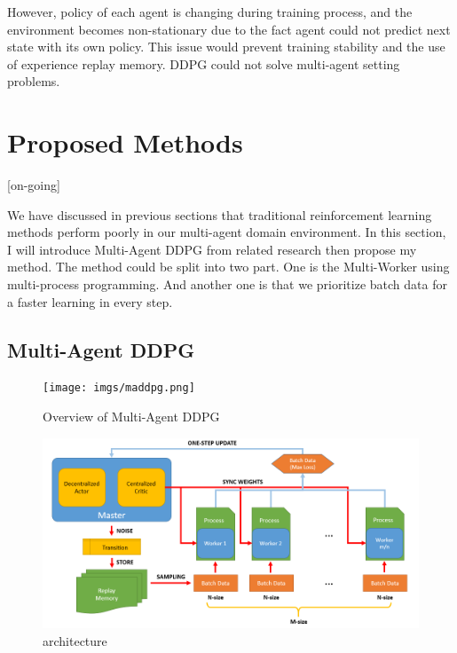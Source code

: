 \documentclass[11pt,twocolumn]{jarticle} %
\begin{document}
However, policy of each agent is changing during training process, and the environment becomes non-stationary due to the fact agent could not predict next state with its own policy. This issue would prevent training stability and the use of experience replay memory. DDPG could not solve multi-agent setting problems. \par

\section{Proposed Methods}[on-going]

We have discussed in previous sections that traditional reinforcement learning methods perform poorly in our multi-agent domain environment. In this section, I will introduce Multi-Agent DDPG from related research then propose my method. The method could be split into two part. One is the Multi-Worker using multi-process programming. And another one is that we prioritize batch data for a faster learning in every step.

\subsection{Multi-Agent DDPG}
\begin{figure}[ht]
 \begin{center}
  \texttt{[image: imgs/maddpg.png]}
  \caption{Overview of Multi-Agent DDPG\cite{maddpg}}
  \label{fig:maddpg}
 \end{center}
\end{figure}

\begin{figure}[h]
 \begin{center}
  \includegraphics[width=12cm]{imgs/architecture.PNG}
  \caption{architecture}
  \label{fig:architecture}
 \end{center}
\end{figure}
\end{document}
